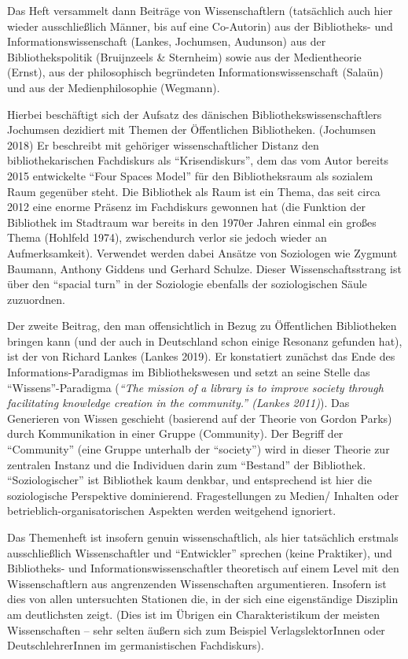 \documentclass[a4paper,
fontsize=11pt,
oneside,
numbers=noperiodatend,
parskip=half-,
bibliography=totoc,
final
]{scrartcl}
\begin{document}
Das Heft versammelt dann Beiträge von Wissenschaftlern (tatsächlich auch
hier wieder ausschließlich Männer, bis auf eine Co-Autorin) aus der
Bibliotheks- und Informationswissenschaft (Lankes, Jochumsen, Audunson)
aus der Bibliothekspolitik (Bruijnzeels \& Sternheim) sowie aus der
Medientheorie (Ernst), aus der philosophisch begründeten
Informationswissenschaft (Salaün) und aus der Medienphilosophie
(Wegmann).

Hierbei beschäftigt sich der Aufsatz des dänischen
Bibliothekswissenschaftlers Jochumsen dezidiert mit Themen der
Öffentlichen Bibliotheken. (Jochumsen 2018) Er beschreibt mit gehöriger
wissenschaftlicher Distanz den bibliothekarischen Fachdiskurs als
\enquote{Krisendiskurs}, dem das vom Autor bereits 2015 entwickelte
\enquote{Four Spaces Model} für den Bibliotheksraum als sozialem Raum
gegenüber steht. Die Bibliothek als Raum ist ein Thema, das seit circa
2012 eine enorme Präsenz im Fachdiskurs gewonnen hat (die Funktion der
Bibliothek im Stadtraum war bereits in den 1970er Jahren einmal ein
großes Thema (Hohlfeld 1974), zwischendurch verlor sie jedoch wieder an
Aufmerksamkeit). Verwendet werden dabei Ansätze von Soziologen wie
Zygmunt Baumann, Anthony Giddens und Gerhard Schulze. Dieser
Wissenschaftsstrang ist über den \enquote{spacial turn} in der
Soziologie ebenfalls der soziologischen Säule zuzuordnen.

Der zweite Beitrag, den man offensichtlich in Bezug zu Öffentlichen
Bibliotheken bringen kann (und der auch in Deutschland schon einige
Resonanz gefunden hat), ist der von Richard Lankes (Lankes 2019). Er
konstatiert zunächst das Ende des Informations-Paradigmas im
Bibliothekswesen und setzt an seine Stelle das
\enquote{Wissens}-Paradigma (\emph{\enquote{The mission of a library is
to improve society through facilitating knowledge creation in the
community.} (Lankes 2011)}). Das Generieren von Wissen geschieht
(basierend auf der Theorie von Gordon Parks) durch Kommunikation in
einer Gruppe (Community). Der Begriff der \enquote{Community} (eine
Gruppe unterhalb der \enquote{society}) wird in dieser Theorie zur
zentralen Instanz und die Individuen darin zum \enquote{Bestand} der
Bibliothek. \enquote{Soziologischer} ist Bibliothek kaum denkbar, und
entsprechend ist hier die soziologische Perspektive dominierend.
Fragestellungen zu Medien/ Inhalten oder betrieblich-organisatorischen
Aspekten werden weitgehend ignoriert.

Das Themenheft ist insofern genuin wissenschaftlich, als hier
tatsächlich erstmals ausschließlich Wissenschaftler und
\enquote{Entwickler} sprechen (keine Praktiker), und Bibliotheks- und
Informationswissenschaftler theoretisch auf einem Level mit den
Wissenschaftlern aus angrenzenden Wissenschaften argumentieren. Insofern
ist dies von allen untersuchten Stationen die, in der sich eine
eigenständige Disziplin am deutlichsten zeigt. (Dies ist im Übrigen ein
Charakteristikum der meisten Wissenschaften -- sehr selten äußern sich
zum Beispiel VerlagslektorInnen oder DeutschlehrerInnen im
germanistischen Fachdiskurs).
\end{document}
